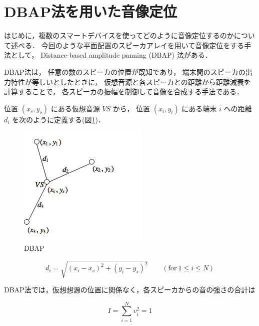 
\section{DBAP法を用いた音像定位}

はじめに，複数のスマートデバイスを使ってどのように音像定位するのかについて述べる．
今回のような平面配置のスピーカアレイを用いて音像定位をする手法として，
Distance-based amplitude panning (DBAP) 法\cite{dbap}がある．

DBAP法は，
任意の数のスピーカの位置が既知であり，
端末間のスピーカの出力特性が等しいとしたときに，
仮想音源と各スピーカとの距離から距離減衰を計算することで，
各スピーカの振幅を制御して音像を合成する手法である．

位置 $(x_s,y_s)$ にある仮想音源 $VS$ から，
位置 $(x_i,y_i)$ にある端末 $i$ への距離 $d_i$ を次のように定義する(図\ref{fig:DBAP})．

\begin{figure}[tb]\centering
  \hspace{-2mm}\includegraphics[clip,width=1.1\hsize]{img/DBAP.png}
  \caption{DBAP}\label{fig:DBAP}
\end{figure}

$$
d_i = \sqrt{(x_i - x_s)^2 + (y_i - y_s)^2} \qquad (\mathrm{for}\ 1 \leq i \leq N)
$$

DBAP法では，仮想想源の位置に関係なく，各スピーカからの音の強さの合計は

$$
I = \sum_{i=1}^N v_i^2 = 1
$$


